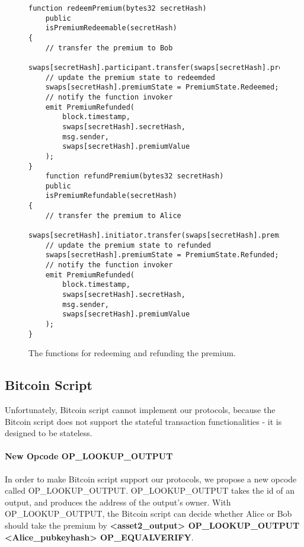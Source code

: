 \begin{figure}
\begin{lstlisting}[language=Solidity, basicstyle=\tiny]
function redeemPremium(bytes32 secretHash)
    public
    isPremiumRedeemable(secretHash)
{
    // transfer the premium to Bob
    swaps[secretHash].participant.transfer(swaps[secretHash].premiumValue);
    // update the premium state to redeemded
    swaps[secretHash].premiumState = PremiumState.Redeemed;
    // notify the function invoker
    emit PremiumRefunded(
        block.timestamp,
        swaps[secretHash].secretHash,
        msg.sender,
        swaps[secretHash].premiumValue
    );
}
    function refundPremium(bytes32 secretHash)
    public
    isPremiumRefundable(secretHash)
{
    // transfer the premium to Alice
    swaps[secretHash].initiator.transfer(swaps[secretHash].premiumValue);
    // update the premium state to refunded
    swaps[secretHash].premiumState = PremiumState.Refunded;
    // notify the function invoker
    emit PremiumRefunded(
        block.timestamp,
        swaps[secretHash].secretHash,
        msg.sender,
        swaps[secretHash].premiumValue
    );
}
\end{lstlisting}
\label{code:premium_redeem_refund_function}
\caption{The functions for redeeming and refunding the premium.}
\end{figure}


\subsection{Bitcoin Script}

Unfortunately, Bitcoin script cannot implement our protocols, because the Bitcoin script does not support the stateful transaction functionalities - it is designed to be stateless. 

\paragraph{New Opcode OP\_LOOKUP\_OUTPUT}
In order to make Bitcoin script support our protocols, we propose a new opcode called OP\_LOOKUP\_OUTPUT.
OP\_LOOKUP\_OUTPUT takes the id of an output, and produces the address of the output's owner.
With OP\_LOOKUP\_OUTPUT, the Bitcoin script can decide whether Alice or Bob should take the premium by \textbf{<asset2\_output> OP\_LOOKUP\_OUTPUT <Alice\_pubkeyhash> OP\_EQUALVERIFY}. 


